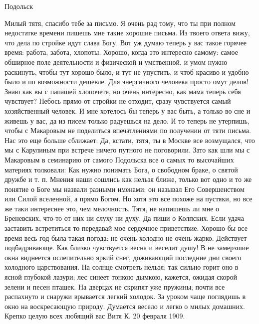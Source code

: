 \documentclass[]{memoir}
\begin{document}

Подольск%



Милый тятя, спасибо тебе  за письмо. Я очень рад тому, что ты при полном недостатке времени пишешь мне такие хорошие письма. Из твоего ответа вижу, что дела по стройке идут слава Богу. Вот уж думаю теперь у вас такое горячее время: работа, забота, хлопоты. Хорошо, когда это интересно самому: самое обширное поле деятельности и физической и умственной, и умом нужно раскинуть, чтобы тут хорошо было, и тут не упустить, и чтоб красиво и удобно было и по возможности дешевле. Для энергичного человека просто омут делов! Знаю как вы с папашей хлопочете, но очень интересно, как мама теперь себя чувствует? Небось прямо от стройки не отходит, сразу чувствуется самый хозяйственный человек. И мне хотелось бы теперь у вас быть, а только во сне и живешь у вас, да из писем только радуешься на дело.  И то теперь не утерпишь, чтобы с Макаровым не поделиться впечатлениями по получении от тяти письма. Нас это еще больше сближает. Да, кстати, тятя, ты в Москве все возмущался, что мы с Карулиным при встрече ничего путного не поговорили. Зато как шли мы с Макаровым в семинарию от самого Подольска все о самых то высочайших материях толковали: Как нужно понимать Бога, о свободном браке, о святой дружбе и т. п. Мнения наши сошлись как нельзя ближе, только вот одно  и то же  понятие о Боге мы назвали разными именами: он называл Его Совершенством или Силой вселенной, а прямо Богом. Но хотя это все похоже на пустяки, но все же таки интереснее это, чем мелочность. 
Тятя, не напишешь ли мне о Бреневских, что-то от них ни слуху ни духу. Да пиши о Колпских. Если удача заставить встретиться  то передавай мое сердечное приветствие. 
Хорошо бы все время весь год была такая погода: не очень холодно не очень жарко. Действует подбадривающе.  Как близко чувствуется весна и веселит душу! В не замерзшие окна виднеется ослепительно яркий снег, доживающий последние дни своего холодного царствования. На солнце смотреть нельзя: так сильно горит оно в ясной глубокой лазури; лес синеет тонкою дымкою, кажется, ожидая скорой зелени и песен пташек. На дверцах не скрипят уже  пружины; почти все распахнуто и снаружи врывается легкий холодок. За уроком чаще поглядишь в окно на воскресающую природу. Думается весело и легко о милых домашних. Крепко целую всех любящий вас Витя К. 
20 февраля 1909.
\end{document}
